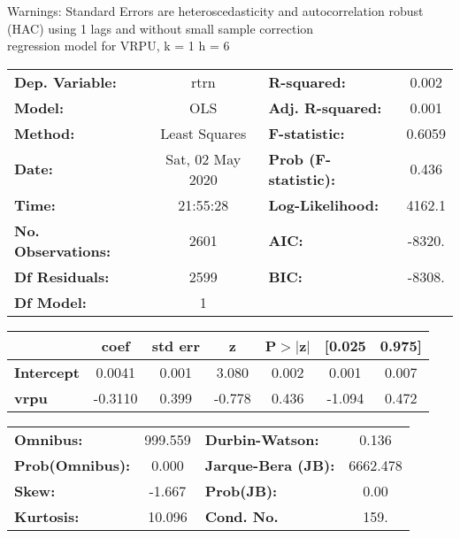 Warnings: \newline
 [1] Standard Errors are heteroscedasticity and autocorrelation robust (HAC) using 1 lags and without small sample correction\\ 

regression model for VRPU, k = 1 h = 6\begin{center}
\begin{tabular}{lclc}
\toprule
\textbf{Dep. Variable:}    &       rtrn       & \textbf{  R-squared:         } &     0.002   \\
\textbf{Model:}            &       OLS        & \textbf{  Adj. R-squared:    } &     0.001   \\
\textbf{Method:}           &  Least Squares   & \textbf{  F-statistic:       } &    0.6059   \\
\textbf{Date:}             & Sat, 02 May 2020 & \textbf{  Prob (F-statistic):} &    0.436    \\
\textbf{Time:}             &     21:55:28     & \textbf{  Log-Likelihood:    } &    4162.1   \\
\textbf{No. Observations:} &        2601      & \textbf{  AIC:               } &    -8320.   \\
\textbf{Df Residuals:}     &        2599      & \textbf{  BIC:               } &    -8308.   \\
\textbf{Df Model:}         &           1      & \textbf{                     } &             \\
\bottomrule
\end{tabular}
\begin{tabular}{lcccccc}
                   & \textbf{coef} & \textbf{std err} & \textbf{z} & \textbf{P$> |$z$|$} & \textbf{[0.025} & \textbf{0.975]}  \\
\midrule
\textbf{Intercept} &       0.0041  &        0.001     &     3.080  &         0.002        &        0.001    &        0.007     \\
\textbf{vrpu}      &      -0.3110  &        0.399     &    -0.778  &         0.436        &       -1.094    &        0.472     \\
\bottomrule
\end{tabular}
\begin{tabular}{lclc}
\textbf{Omnibus:}       & 999.559 & \textbf{  Durbin-Watson:     } &    0.136  \\
\textbf{Prob(Omnibus):} &   0.000 & \textbf{  Jarque-Bera (JB):  } & 6662.478  \\
\textbf{Skew:}          &  -1.667 & \textbf{  Prob(JB):          } &     0.00  \\
\textbf{Kurtosis:}      &  10.096 & \textbf{  Cond. No.          } &     159.  \\
\bottomrule
\end{tabular}
\end{center}

